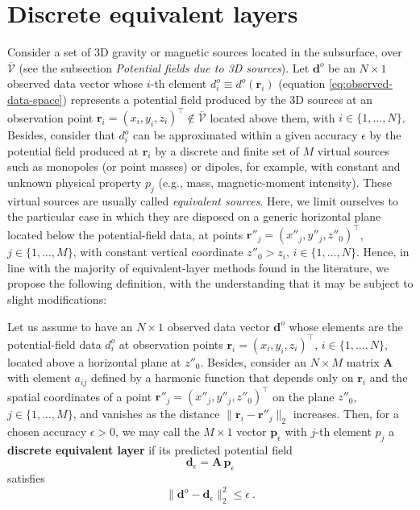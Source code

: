 \section{Discrete equivalent layers}
\label{eq:equivalent_layer_technique}

Consider a set of 3D gravity or magnetic sources located in the subsurface,
over $\overline{\mathcal{V}}$ (see the subsection \textit{Potential fields due to 3D sources}). 
Let $\mathbf{d}^{o}$ be an $N \times 1$ observed data vector whose $i$-th element
$d^{o}_{i} \equiv d^{o}(\mathbf{r}_{i})$ (equation \ref{eq:observed-data-space}) 
represents a potential field produced by the 3D sources 
at an observation point $\mathbf{r}_{i} = ( x_{i} , y_{i} , z_{i} )^{\top} \notin \overline{\mathcal{V}}$
located above them, with $i \in \{ 1, \dots, N \}$.
Besides, consider that $d^{o}_{i}$ can be approximated within a given accuracy $\epsilon$ 
by the potential field produced at $\mathbf{r}_{i}$ by a discrete and finite set of $M$ 
virtual sources such as monopoles (or point masses) or dipoles, for example, with 
constant and unknown physical property $p_{j}$ (e.g., mass, magnetic-moment intensity). 
These virtual sources are usually called \textit{equivalent sources}.
Here, we limit ourselves to the particular case in which they are disposed on a 
generic horizontal plane located below the potential-field data, at points 
$\mathbf{r}''_{j} = ( x''_{j} , y''_{j} , z''_{0} )^{\top}$,
$j \in \{ 1, \dots, M \}$, with constant vertical coordinate $z''_{0} > z_{i}$, $i \in \{ 1, \dots, N \}$. 
Hence, in line with the majority of equivalent-layer methods found in the literature, we propose the following 
definition, with the understanding that it may be subject to slight modifications:
\begin{definition}
	Let us assume to have an $N \times 1$ observed data vector $\mathbf{d}^{o}$ whose elements 
	are the potential-field data $d^{o}_{i}$ at observation points $\mathbf{r}_{i} = ( x_{i} , y_{i} , z_{i} )^{\top}$, 
	$i \in \{1, \dots, N\}$, located above a horizontal plane at $z''_{0}$. Besides, consider an $N \times M$ 
	matrix $\mathbf{A}$ with element $a_{ij}$ defined by a harmonic function that depends only on $\mathbf{r}_{i}$ 
	and the spatial coordinates of a point $\mathbf{r}''_{j} = ( x''_{j} , y''_{j} , z''_{0} )^{\top}$ on the plane $z''_{0}$,
	$j \in \{1, \dots, M\}$, and
	vanishes as the distance $\| \mathbf{r}_{i} - \mathbf{r}''_{j} \|_{2}$ increases. 
	Then, for a chosen accuracy $\epsilon > 0$, we may call the $M \times 1$ vector $\mathbf{p}_{\epsilon}$ with $j$-th element $p_{j}$ 
	a \textbf{discrete equivalent layer} if its predicted potential field 
	\begin{equation}
		\mathbf{d}_{\epsilon} = \mathbf{A} \, \mathbf{p}_{\epsilon}
		\label{eq:predicted-data-vector}
	\end{equation}
	satisfies 
	\begin{equation}
		\| \mathbf{d}^{o} - \mathbf{d}_{\epsilon} \|_{2}^{2} \le \epsilon \: .
		\label{eq:epsilon-bound-data-discrete}
	\end{equation}
	\label{def:discrete-eqlayer}
\end{definition}
